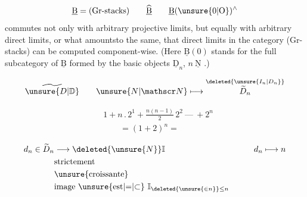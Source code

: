 
\[
\underline{\mathrm B}=(\text{Gr-stacks})\qquad
\widehat{\underline{\mathrm B}}\qquad
\underline{\mathrm B}(\unsure{0|\mathrm O})^{\wedge}
\]
commutes not only with arbitrary projective limits, but equally with arbitrary direct limits, or what amountsto the same, that direct limits in the category (Gr-stacks) can be computed component-wise. (Here \(\underline{\mathrm B}(0)\) stands for the full subcategory of \(\underline{\mathrm B}\) formed by the basic objects \(\underline{\mathrm D}_n\), \(n\ \underline{\mathrm N}\) .)

\[
\widetilde{\unsure{D|\mathbb D}}\qquad
\unsure{N|\mathscr N}\longmapsto
\overset{\deleted{\unsure{I_n|D_n}}}{\widetilde D_n}
\]

\[
\begin{aligned}
&1+n\mathbin{.}2^1+\frac{n(n-1)}{2}\,2^2\ \text{---}\ +2^n\\
&\qquad=(1+2)^n=
\end{aligned}
\]

\[
\begin{aligned}
d_n\in\widetilde D_n&\longrightarrow\deleted{\unsure{N}}\mathbb I
 &\qquad d_n&\longmapsto n\\
&\text{strictement}\\
&\text{\unsure{croissante}}\\
&\text{image \unsure{est|\(=\)|\(\subset\)}}\ \mathbb I_{\deleted{\unsure{\in n}}\leq n}
\end{aligned}
\]


